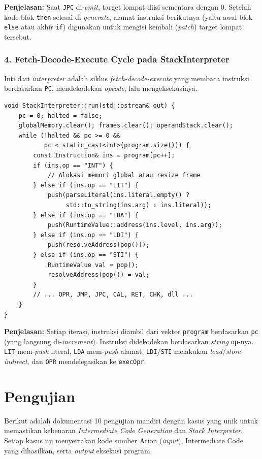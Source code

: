 \documentclass[12pt, a4paper]{article}
\begin{document}
\textbf{Penjelasan:} Saat \texttt{JPC} di-\textit{emit}, target lompat diisi sementara dengan 0. Setelah kode blok \texttt{then} selesai di-\textit{generate}, alamat instruksi berikutnya (yaitu awal blok \texttt{else} atau akhir \texttt{if}) digunakan untuk mengisi kembali (\textit{patch}) target lompat tersebut.

\vspace{0.5cm}

\subsubsection*{4. Fetch-Decode-Execute Cycle pada StackInterpreter}
Inti dari \textit{interpreter} adalah siklus \textit{fetch-decode-execute} yang membaca instruksi berdasarkan \texttt{PC}, mendekodekan \textit{opcode}, lalu mengeksekusinya.

\begin{lstlisting}[caption={Siklus eksekusi utama pada StackInterpreter::run}]
void StackInterpreter::run(std::ostream& out) {
    pc = 0; halted = false;
    globalMemory.clear(); frames.clear(); operandStack.clear();
    while (!halted && pc >= 0 &&
           pc < static_cast<int>(program.size())) {
        const Instruction& ins = program[pc++];
        if (ins.op == "INT") {
            // Alokasi memori global atau resize frame
        } else if (ins.op == "LIT") {
            push(parseLiteral(ins.literal.empty() ?
                 std::to_string(ins.arg) : ins.literal));
        } else if (ins.op == "LDA") {
            push(RuntimeValue::address(ins.level, ins.arg));
        } else if (ins.op == "LDI") {
            push(resolveAddress(pop()));
        } else if (ins.op == "STI") {
            RuntimeValue val = pop();
            resolveAddress(pop()) = val;
        }
        // ... OPR, JMP, JPC, CAL, RET, CHK, dll ...
    }
}
\end{lstlisting}

\textbf{Penjelasan:} Setiap iterasi, instruksi diambil dari vektor \texttt{program} berdasarkan \texttt{pc} (yang langsung di-\textit{increment}). Instruksi didekodekan berdasarkan \textit{string} \texttt{op}-nya. \texttt{LIT} mem-\textit{push} literal, \texttt{LDA} mem-\textit{push} alamat, \texttt{LDI}/\texttt{STI} melakukan \textit{load}/\textit{store indirect}, dan \texttt{OPR} mendelegasikan ke \texttt{execOpr}.


\section{Pengujian}
Berikut adalah dokumentasi 10 pengujian mandiri dengan kasus yang unik untuk memastikan kebenaran \textit{Intermediate Code Generation} dan \textit{Stack Interpreter}. Setiap kasus uji menyertakan kode sumber Arion (\textit{input}), Intermediate Code yang dihasilkan, serta \textit{output} eksekusi program.
\end{document}
